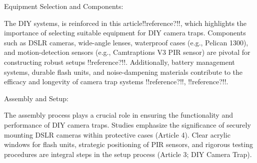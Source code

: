 \documentclass[class=report,11pt,crop=false]{standalone}
\begin{document}
Equipment Selection and Components: 

The DIY systems, is reinforced in this article!!reference?!!, which highlights the importance of selecting suitable equipment for DIY camera traps. Components such as DSLR cameras, wide-angle lenses, waterproof cases (e.g., Pelican 1300), and motion-detection sensors (e.g., Camtraptions V3 PIR sensor) are pivotal for constructing robust setups !!reference?!!. Additionally, battery management systems, durable flash units, and noise-dampening materials contribute to the efficacy and longevity of camera trap systems !!reference?!!, !!reference?!!.

 

Assembly and Setup: 

The assembly process plays a crucial role in ensuring the functionality and performance of DIY camera traps. Studies emphasize the significance of securely mounting DSLR cameras within protective cases (Article 4). Clear acrylic windows for flash units, strategic positioning of PIR sensors, and rigorous testing procedures are integral steps in the setup process (Article 3; DIY Camera Trap). 

\ifstandalone

\printnoidxglossary[type=\acronymtype,nonumberlist]
\fi
\end{document}
